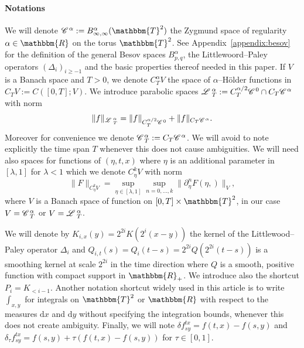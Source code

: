\documentclass[11pt,reqno]{amsart}
\newcommand{\assign}{:=}
\newcommand{\mathd}{\mathrm{d}}
\newcommand{\CC}{\mathscr{C} \hspace{.1em}}
\newcommand{\LL}{\mathscr{L} \hspace{.2em}}
\begin{document}
\

\paragraph{Notations}We will denote $\CC^{\alpha} \assign B^{\alpha}_{\infty,
\infty} (\mathbbm{T}^2)$ the Zygmund space of regularity $\alpha \in
\mathbbm{R}$ on the torus $\mathbbm{T}^2$. See Appendix~\ref{appendix:besov}
for the definition of the general Besov spaces $B^{\alpha}_{p, q}$, the
Littlewoord--Paley operators $(\Delta_i)_{i \geqslant - 1}$ and the basic
properties thereof needed in this paper. If $V$ is a Banach space and $T > 0$,
we denote $C_T^{\alpha} V$ the space of $\alpha$--H{\"o}lder functions in $C_T
V \assign C ([0, T] ; V)$. We introduce parabolic spaces $\LL^{\alpha}_T
\assign C_T^{\alpha / 2} \CC^0 \cap C_T \CC^{\alpha}$ with norm
\begin{equation}
  \| f \|_{\LL^{\alpha}_T} = \| f \|_{C_T^{\alpha / 2} \CC^0} + \| f \|_{C_T
  \CC^{\alpha}} . \label{e:def-Lnorm}
\end{equation}
Moreover for convenience we denote $\CC_T^{\alpha} \assign C_T \CC^{\alpha}$.
We will avoid to note explicitly the time span $T$ whenever this does not
cause ambiguities. We will need also spaces for functions of $(\eta, t, x)$
where $\eta$ is an additional parameter in $[\lambda, 1]$ for $\lambda < 1$
which we denote $C_{\eta}^k V$ with norm
\begin{equation}
  \| F \|_{C_{\eta}^k V} = \sup_{\eta \in [\lambda, 1]} \sup_{n = 0, \ldots,
  k} \| \partial_{\eta}^n F (\eta,) \|_V, \label{e:def-Cetanorm}
\end{equation}
where $V$ is a Banach space of function on $[0, T] \times \mathbbm{T}^2$, in
our case $V = \CC_T^{\alpha}$ or $V = \LL^{\alpha}_T$.

We will denote by $K_{i, x} (y) = 2^{2 i} K (2^i (x - y))$ the kernel of the
Littlewood--Paley operator $\Delta_i$ and $Q_{i, t} (s) = Q_i (t - s) = 2^{2
i} Q (2^{2 i} (t - s))$ is a smoothing kernel at scale $2^{2 i}$ in the time
direction where $Q$ is a smooth, positive function with compact support in
$\mathbbm{R}_+$. We introduce also the shortcut $P_i = K_{< i - 1}$. Another
notation shortcut widely used in this article is to write $\int_{x, y}$ for
integrals on $\mathbbm{T}^2$ or $\mathbbm{R}$ with respect to the measures
$\mathd x$ and $\mathd y$ without specifying the integration bounds, whenever
this does not create ambiguity. Finally, we will note $\delta f^{t x}_{s y} =
f (t, x) - f (s, y)$ and $\delta_{\tau} f_{s y}^{t x} = f (s, y) + \tau (f (t,
x) - f (s, y))$ for $\tau \in [0, 1]$.
\end{document}
